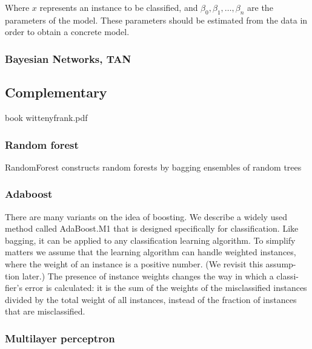 \documentclass[conference,a4paper]{IEEEtran}
\begin{document}
Where $x$ represents an instance to be classified, and $\beta_0, \beta_1, \dots , \beta_n$ are the parameters of the model. These parameters should be estimated from the data in order to obtain a concrete model.

\subsubsection{Bayesian Networks, TAN}


\subsection{Complementary}

book wittenyfrank.pdf

\subsubsection{Random forest}

RandomForest constructs random forests by bagging ensembles of random trees

\subsubsection{Adaboost}

There are many variants on the idea of boosting. We describe a widely used method called AdaBoost.M1 that is designed specifically for classification. Like bagging, it can be applied to any classification learning algorithm. To simplify matters we assume that the learning algorithm can handle weighted instances, where the weight of an instance is a positive number. (We revisit this assump- tion later.) The presence of instance weights changes the way in which a classi- fier’s error is calculated: it is the sum of the weights of the misclassified instances divided by the total weight of all instances, instead of the fraction of instances that are misclassified.

\subsubsection{Multilayer perceptron}
\end{document}

